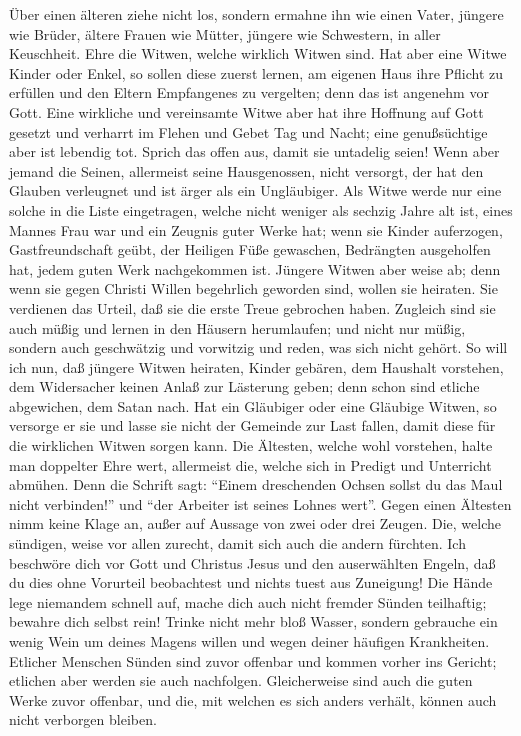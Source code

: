  Über einen älteren ziehe nicht los, sondern ermahne ihn
wie einen Vater, jüngere wie Brüder,  ältere Frauen wie
Mütter, jüngere wie Schwestern, in aller Keuschheit.  Ehre
die Witwen, welche wirklich Witwen sind.  Hat aber eine
Witwe Kinder oder Enkel, so sollen diese zuerst lernen, am eigenen Haus
ihre Pflicht zu erfüllen und den Eltern Empfangenes zu vergelten; denn
das ist angenehm vor Gott.  Eine wirkliche und vereinsamte
Witwe aber hat ihre Hoffnung auf Gott gesetzt und verharrt im Flehen und
Gebet Tag und Nacht;  eine genußsüchtige aber ist lebendig
tot.  Sprich das offen aus, damit sie untadelig seien!
 Wenn aber jemand die Seinen, allermeist seine
Hausgenossen, nicht versorgt, der hat den Glauben verleugnet und ist
ärger als ein Ungläubiger.  Als Witwe werde nur eine
solche in die Liste eingetragen, welche nicht weniger als sechzig Jahre
alt ist, eines Mannes Frau war  und ein Zeugnis guter
Werke hat; wenn sie Kinder auferzogen, Gastfreundschaft geübt, der
Heiligen Füße gewaschen, Bedrängten ausgeholfen hat, jedem guten Werk
nachgekommen ist.  Jüngere Witwen aber weise ab; denn
wenn sie gegen Christi Willen begehrlich geworden sind, wollen sie
heiraten.  Sie verdienen das Urteil, daß sie die erste
Treue gebrochen haben.  Zugleich sind sie auch müßig und
lernen in den Häusern herumlaufen; und nicht nur müßig, sondern auch
geschwätzig und vorwitzig und reden, was sich nicht gehört.
 So will ich nun, daß jüngere Witwen heiraten, Kinder
gebären, dem Haushalt vorstehen, dem Widersacher keinen Anlaß zur
Lästerung geben;  denn schon sind etliche abgewichen, dem
Satan nach.  Hat ein Gläubiger oder eine Gläubige Witwen,
so versorge er sie und lasse sie nicht der Gemeinde zur Last fallen,
damit diese für die wirklichen Witwen sorgen kann.  Die
Ältesten, welche wohl vorstehen, halte man doppelter Ehre wert,
allermeist die, welche sich in Predigt und Unterricht abmühen.
 Denn die Schrift sagt: ``Einem dreschenden Ochsen sollst
du das Maul nicht verbinden!'' und ``der Arbeiter ist seines Lohnes
wert''.  Gegen einen Ältesten nimm keine Klage an, außer
auf Aussage von zwei oder drei Zeugen.  Die, welche
sündigen, weise vor allen zurecht, damit sich auch die andern fürchten.
 Ich beschwöre dich vor Gott und Christus Jesus und den
auserwählten Engeln, daß du dies ohne Vorurteil beobachtest und nichts
tuest aus Zuneigung!  Die Hände lege niemandem schnell
auf, mache dich auch nicht fremder Sünden teilhaftig; bewahre dich
selbst rein!  Trinke nicht mehr bloß Wasser, sondern
gebrauche ein wenig Wein um deines Magens willen und wegen deiner
häufigen Krankheiten.  Etlicher Menschen Sünden sind
zuvor offenbar und kommen vorher ins Gericht; etlichen aber werden sie
auch nachfolgen.  Gleicherweise sind auch die guten Werke
zuvor offenbar, und die, mit welchen es sich anders verhält, können auch
nicht verborgen bleiben.


